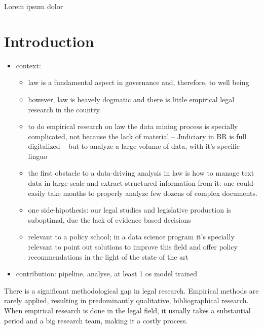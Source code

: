 \documentclass[
  12pt,
  letterpaper,
]{book}
\providecommand{\tightlist}{%
  \setlength{\itemsep}{0pt}\setlength{\parskip}{0pt}}\usepackage{longtable,booktabs,array}
\begin{document}
\newpage
\tableofcontents
\thispagestyle{empty}


\setcounter{page}{1}

\newpage

Lorem ipsum dolor


\chapter{Introduction}\label{introduction}

\begin{itemize}
\tightlist
\item
  context:

  \begin{itemize}
  \tightlist
  \item
    law is a fundamental aspect in governance and, therefore, to well
    being
  \item
    however, law is heavely dogmatic and there is little empirical legal
    research in the country.
  \item
    to do empirical research on law the data mining process is specially
    complicated, not because the lack of material -- Judiciary in BR is
    full digitalized -- but to analyze a large volume of data, with it's
    specific linguo
  \item
    the first obstacle to a data-driving analysis in law is how to
    manage text data in large scale and extract structured information
    from it: one could easily take months to properly analyze few dozens
    of complex documents.
  \item
    one side-hipothesis: our legal studies and legislative production is
    suboptimal, due the lack of evidence based decisions
  \item
    relevant to a policy school; in a data science program it's
    specially relevant to point out solutions to improve this field and
    offer policy recommendations in the light of the state of the art
  \end{itemize}
\item
  contribution: pipeline, analyse, at least 1 os model trained
\end{itemize}

There is a significant methodological gap in legal research. Empirical
methods are rarely applied, resulting in predominantly qualitative,
bibliographical research. When empirical research is done in the legal
field, it usually takes a substantial period and a big research team,
making it a costly process.
\end{document}
